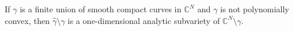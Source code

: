 
If $\gamma$ is a finite union of smooth compact curves in $\mathbb{C}^N$ and $\gamma$ is not polynomially convex, then $\hat{\gamma} \setminus \gamma$ is a one-dimensional analytic subvariety of $\mathbb{C}^N \setminus \gamma$.
